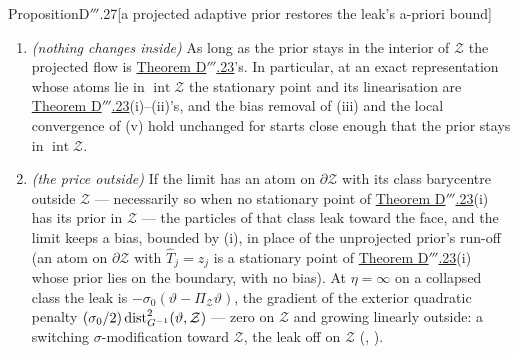\begin{thm}{Proposition}{D$'''$.27}[a projected adaptive prior restores the leak's a-priori
bound]
\begin{enumerate}[label=\textup{(\roman*)}]
    $\mathcal{J} + \iota_{\mathcal{Z}^{K_0}}(Z)$ in the metric of \hyperref[res:thmDppp:23]{Theorem D$'''$.23}(i)
    (for $\mathcal{J}_\circ$ with the cell masses) --- at $\eta = \infty$ in its selected form
    $\mathcal{J}(\Theta,\Pi_{\mathcal{Z}}\hat T(\gamma))$, $\gamma$ the plan the flow carries, optimal for its own
    projected barycentres (Lloyd-consistent) but not necessarily jointly optimal, so that the reduced energy
    $\min_{Z\in\mathcal{Z}^{K_0}}\mathcal{J}$ itself need not decrease. At $\eta = \infty$ the bounded solutions are
    expected to converge, by a Kurdyka--{\L}ojasiewicz argument on the finitely many selected pieces, to a critical
    point of a Lloyd-consistent piece, which need not be Clarke-critical for the reduced energy; at finite $\eta$ the
    solutions are expected to converge to Clarke-critical points of $\mathcal{J} + \iota$. At a critical point with a
    unique plan the prior is a stationary point of \hyperref[res:thmDppp:23]{Theorem D$'''$.23}(i) where it is
    interior, and each boundary atom satisfies the Karush--Kuhn--Tucker condition
    $z_j = \Pi_{\mathcal{Z}}(\hat T_j)$, $\hat T_j - z_j$ in the normal cone of $\mathcal{Z}$ at $z_j$; at a tie of
    plans the condition holds for a convex combination of the active pieces, as in Proposition D$'''$.17(iii).
  \item \emph{(nothing changes inside)} As long as the prior stays in the interior of $\mathcal{Z}$ the projected flow
    is \hyperref[res:thmDppp:23]{Theorem D$'''$.23}'s. In particular, at an exact representation whose atoms lie in
    $\operatorname{int}\mathcal{Z}$ the stationary point and its linearisation are
    \hyperref[res:thmDppp:23]{Theorem D$'''$.23}(i)--(ii)'s, and the bias removal of (iii) and the local convergence
    of (v) hold unchanged for starts close enough that the prior stays in $\operatorname{int}\mathcal{Z}$.
  \item \emph{(the price outside)} If the limit has an atom on $\partial\mathcal{Z}$ with its class barycentre outside
    $\mathcal{Z}$ --- necessarily so when no stationary point of \hyperref[res:thmDppp:23]{Theorem D$'''$.23}(i) has
    its prior in $\mathcal{Z}$ --- the particles of that class leak toward the face, and the limit keeps a bias,
    bounded by (i), in place of the unprojected prior's run-off (an atom on $\partial\mathcal{Z}$ with
    $\hat T_j = z_j$ is a stationary point of \hyperref[res:thmDppp:23]{Theorem D$'''$.23}(i) whose prior lies on the
    boundary, with no bias). At $\eta = \infty$ on a collapsed class the leak is
    $-\sigma_0(\vartheta - \Pi_{\mathcal{Z}}\vartheta)$, the gradient of the exterior quadratic penalty
    $(\sigma_0/2)\operatorname{dist}^2_{G^{-1}}(\vartheta,\mathcal{Z})$ --- zero on $\mathcal{Z}$ and growing linearly
    outside: a switching $\sigma$-modification toward $\mathcal{Z}$, the leak off on $\mathcal{Z}$
    (\cite{ioannou1996}, \cite{S52}).
\end{enumerate}
\end{thm}

